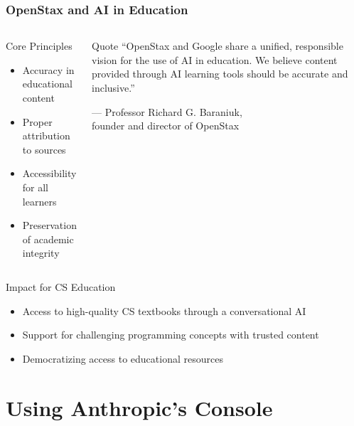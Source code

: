 \documentclass{beamer}
\begin{document}
\begin{frame}
\frametitle{OpenStax and AI in Education}

\begin{columns}
\begin{block}{Core Principles}
\begin{itemize}
\item Accuracy in educational content
\item Proper attribution to sources
\item Accessibility for all learners
\item Preservation of academic integrity
\end{itemize}
\end{block}

\begin{alertblock}{Quote}
\small ``OpenStax and Google share a unified, responsible vision for the use of AI in education. We believe content provided through AI learning tools should be accurate and inclusive.''
\begin{flushright}
\scriptsize — Professor Richard G. Baraniuk,\\founder and director of OpenStax
\end{flushright}
\end{alertblock}
\end{columns}

\vspace{0.5cm}
\begin{block}{Impact for CS Education}
\begin{itemize}
\item Access to high-quality CS textbooks through a conversational AI
\item Support for challenging programming concepts with trusted content
\item Democratizing access to educational resources
\end{itemize}
\end{block}
\end{frame}

\section{Using Anthropic's Console}
\frame{\sectionpage}
\end{document}
